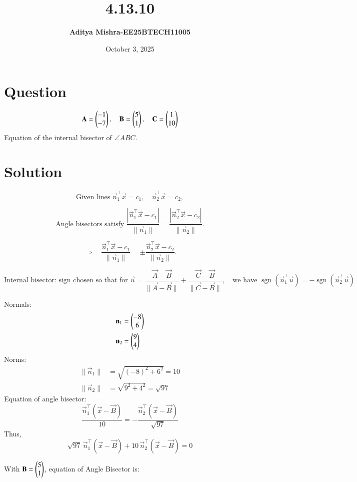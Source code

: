 \documentclass[12pt]{article}
\title{\textbf{4.13.10}}
\author{\textbf{Aditya Mishra-EE25BTECH11005}}
\date{October 3, 2025}
\begin{document}
\maketitle

\section*{Question}
\[
\mathbf{A} = \begin{pmatrix}-1\\-7\end{pmatrix},\quad
\mathbf{B} = \begin{pmatrix}5\\1\end{pmatrix},\quad
\mathbf{C} = \begin{pmatrix}1\\10\end{pmatrix}
\]
Equation of the internal bisector of $\angle ABC$.

\section*{Solution}

\[
\text{Given lines } \vec{n}_1^{\top} \vec{x} = c_1, \quad \vec{n}_2^{\top} \vec{x} = c_2,
\]

\[
\text{Angle bisectors satisfy }
\frac{|\vec{n}_1^{\top} \vec{x} - c_1|}{\|\vec{n}_1\|}
= \frac{|\vec{n}_2^{\top} \vec{x} - c_2|}{\|\vec{n}_2\|}.
\]

\[
\Rightarrow \quad
\frac{\vec{n}_1^{\top} \vec{x} - c_1}{\|\vec{n}_1\|}
= \pm \frac{\vec{n}_2^{\top} \vec{x} - c_2}{\|\vec{n}_2\|}.
\]

\[
\text{Internal bisector: sign chosen so that for }
\vec{u} =
\frac{\vec{A}-\vec{B}}{\|\vec{A}-\vec{B}\|}
+
\frac{\vec{C}-\vec{B}}{\|\vec{C}-\vec{B}\|},
\quad
\text{we have }
\operatorname{sgn}(\vec{n}_1^{\top} \vec{u}) = -\operatorname{sgn}(\vec{n}_2^{\top} \vec{u})
\]

Normals:
\begin{align}
\mathbf{n}_1 &= \begin{pmatrix}-8\\6\end{pmatrix} \\
\mathbf{n}_2 &= \begin{pmatrix}9\\4\end{pmatrix}
\end{align}
Norms:
\begin{align}
\|\vec{n}_1\| &= \sqrt{(-8)^2 + 6^2} = 10 \\
\|\vec{n}_2\| &= \sqrt{9^2 + 4^2} = \sqrt{97}
\end{align}
Equation of angle bisector:
\[
\frac{\vec{n}_1^{\top} (\vec{x} - \vec{B})}{10}
=
-\frac{\vec{n}_2^{\top} (\vec{x} - \vec{B})}{\sqrt{97}}
\]
Thus,
\[
\sqrt{97}\,\vec{n}_1^{\top} (\vec{x} - \vec{B}) + 10\,\vec{n}_2^{\top} (\vec{x} - \vec{B}) = 0
\]

With
$\mathbf{B} = \begin{pmatrix}5\\1\end{pmatrix}$, equation of Angle Bisector is:
\end{document}
